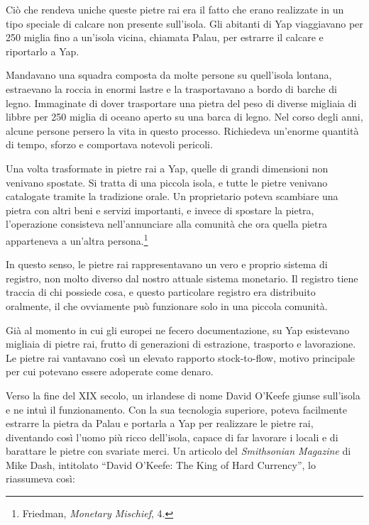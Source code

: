 \documentclass[
  a5paper,
  smalldemyvopaper,10pt,twoside,onecolumn,openright,extrafontsizes,hidelinks]{memoir}
\begin{document}
Ciò che rendeva uniche queste pietre rai era il fatto che erano
realizzate in un tipo speciale di calcare non presente sull'isola. Gli
abitanti di Yap viaggiavano per 250 miglia fino a un'isola vicina,
chiamata Palau, per estrarre il calcare e riportarlo a Yap.

Mandavano una squadra composta da molte persone su quell'isola lontana,
estraevano la roccia in enormi lastre e la trasportavano a bordo di
barche di legno. Immaginate di dover trasportare una pietra del peso di
diverse migliaia di libbre per 250 miglia di oceano aperto su una barca
di legno. Nel corso degli anni, alcune persone persero la vita in questo
processo. Richiedeva un'enorme quantità di tempo, sforzo e comportava
notevoli pericoli.

Una volta trasformate in pietre rai a Yap, quelle di grandi dimensioni
non venivano spostate. Si tratta di una piccola isola, e tutte le pietre
venivano catalogate tramite la tradizione orale. Un proprietario poteva
scambiare una pietra con altri beni e servizi importanti, e invece di
spostare la pietra, l'operazione consisteva nell'annunciare alla
comunità che ora quella pietra apparteneva a un'altra
persona.\footnote{Friedman, \emph{Monetary Mischief}, 4.}

In questo senso, le pietre rai rappresentavano un vero e proprio sistema
di registro, non molto diverso dal nostro attuale sistema monetario. Il
registro tiene traccia di chi possiede cosa, e questo particolare
registro era distribuito oralmente, il che ovviamente può funzionare
solo in una piccola comunità.

Già al momento in cui gli europei ne fecero documentazione, su Yap
esistevano migliaia di pietre rai, frutto di generazioni di estrazione,
trasporto e lavorazione. Le pietre rai vantavano così un elevato
rapporto stock-to-flow, motivo principale per cui potevano essere
adoperate come denaro.

Verso la fine del XIX secolo, un irlandese di nome David O'Keefe giunse
sull'isola e ne intuì il funzionamento. Con la sua tecnologia superiore,
poteva facilmente estrarre la pietra da Palau e portarla a Yap per
realizzare le pietre rai, diventando così l'uomo più ricco dell'isola,
capace di far lavorare i locali e di barattare le pietre con svariate
merci. Un articolo del \emph{Smithsonian Magazine} di Mike Dash,
intitolato ``David O'Keefe: The King of Hard Currency'', lo riassumeva
così:
\end{document}
